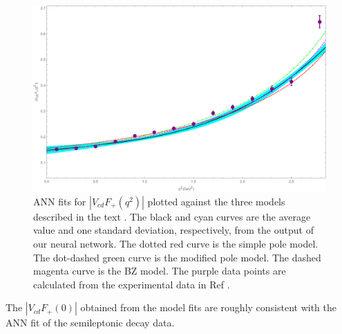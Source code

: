 \begin{figure}[H]
\begin{center}
\includegraphics[scale=0.4]{FF exp final PDisVF_model.pdf}
\caption{ANN fits for $\left|V_{cd} F_+ (q^2)\right|$ plotted against the three models described in the text \cite{Grant:2019yar}. The black and cyan curves are the average value and one 
standard deviation, respectively, from the output of our neural network. The dotted red curve is the simple pole model. The dot-dashed green curve is the modified 
pole model. The dashed magenta curve is the BZ model. The purple data points are calculated from the experimental data in Ref \cite{Ablikim:2015ixa}.}
\label{fig:VFwithModels}
\end{center}
\end{figure}
\vspace{-8mm}
The $|V_{cd}F_+(0)|$ obtained from the model fits are roughly consistent with the ANN fit of the semileptonic decay data. 
%